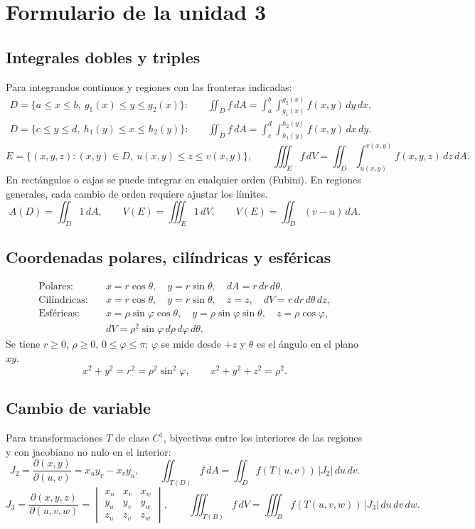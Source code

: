 ﻿\section{Formulario de la unidad 3}
\begingroup
\footnotesize
\setlength{\parindent}{0pt}
\setlength{\abovedisplayskip}{3pt}
\setlength{\belowdisplayskip}{3pt}
\setlength{\abovedisplayshortskip}{3pt}
\setlength{\belowdisplayshortskip}{3pt}

\subsection*{Integrales dobles y triples}
Para integrandos continuos y regiones con las fronteras indicadas:
\begin{align*}
D=\{a\leq x\leq b,\ g_1(x)\leq y\leq g_2(x)\}:&\quad
\iint_D f\,dA=\int_a^b\int_{g_1(x)}^{g_2(x)} f(x,y)\,dy\,dx,\\
D=\{c\leq y\leq d,\ h_1(y)\leq x\leq h_2(y)\}:&\quad
\iint_D f\,dA=\int_c^d\int_{h_1(y)}^{h_2(y)} f(x,y)\,dx\,dy.
\end{align*}
\[
E=\{(x,y,z):(x,y)\in D,\ u(x,y)\leq z\leq v(x,y)\},\qquad
\iiint_E f\,dV=\iint_D\int_{u(x,y)}^{v(x,y)} f(x,y,z)\,dz\,dA.
\]
En rectángulos o cajas se puede integrar en cualquier orden (Fubini).
En regiones generales, cada cambio de orden requiere ajustar los límites.
\[
A(D)=\iint_D1\,dA,\qquad V(E)=\iiint_E1\,dV,
\qquad V(E)=\iint_D(v-u)\,dA.
\]

\subsection*{Coordenadas polares, cilíndricas y esféricas}
\begin{align*}
\text{Polares:}&\quad x=r\cos\theta,\quad y=r\sin\theta,\quad dA=r\,dr\,d\theta,\\
\text{Cilíndricas:}&\quad x=r\cos\theta,\quad y=r\sin\theta,\quad z=z,\quad dV=r\,dr\,d\theta\,dz,\\
\text{Esféricas:}&\quad x=\rho\sin\varphi\cos\theta,\quad
 y=\rho\sin\varphi\sin\theta,\quad z=\rho\cos\varphi,\\
&\quad dV=\rho^2\sin\varphi\,d\rho\,d\varphi\,d\theta.
\end{align*}
Se tiene $r\geq0$, $\rho\geq0$, $0\leq\varphi\leq\pi$;
$\varphi$ se mide desde $+z$ y $\theta$ es el ángulo en el plano $xy$.
\[
x^2+y^2=r^2=\rho^2\sin^2\varphi,\qquad x^2+y^2+z^2=\rho^2.
\]

\subsection*{Cambio de variable}
Para transformaciones $T$ de clase $C^1$, biyectivas entre los interiores de las
regiones y con jacobiano no nulo en el interior:
\[
J_2=\frac{\partial(x,y)}{\partial(u,v)}=x_uy_v-x_vy_u,\qquad
\iint_{T(D)} f\,dA=\iint_D f(T(u,v))\,|J_2|\,du\,dv.
\]
\[
J_3=\frac{\partial(x,y,z)}{\partial(u,v,w)}
=\begin{vmatrix}x_u&x_v&x_w\\y_u&y_v&y_w\\z_u&z_v&z_w\end{vmatrix},\qquad
\iiint_{T(B)}f\,dV=\iiint_B f(T(u,v,w))\,|J_3|\,du\,dv\,dw.
\]

